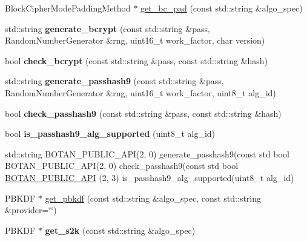 \begin{DoxyCompactItemize}
\item 
Block\+Cipher\+Mode\+Padding\+Method $\ast$ \mbox{\hyperlink{namespace_botan_ac22e1d5609dbde74a5f45f729f4c4c6a}{get\+\_\+bc\+\_\+pad}} (const std\+::string \&algo\+\_\+spec)
\item 
\mbox{\label{namespace_botan_a49cb36777eb93bb3b2ee508a712cf116}} 
std\+::string {\bfseries generate\+\_\+bcrypt} (const std\+::string \&pass, Random\+Number\+Generator \&rng, uint16\+\_\+t work\+\_\+factor, char version)
\item 
\mbox{\label{namespace_botan_a970c31b2eaaeec4fb9262eeabf0e37a1}} 
bool {\bfseries check\+\_\+bcrypt} (const std\+::string \&pass, const std\+::string \&hash)
\item 
\mbox{\label{namespace_botan_ad3dbec5bc18c846714aac5fe71708388}} 
std\+::string {\bfseries generate\+\_\+passhash9} (const std\+::string \&pass, Random\+Number\+Generator \&rng, uint16\+\_\+t work\+\_\+factor, uint8\+\_\+t alg\+\_\+id)
\item 
\mbox{\label{namespace_botan_a9082402c1ec67dfa5dfcf73261814058}} 
bool {\bfseries check\+\_\+passhash9} (const std\+::string \&pass, const std\+::string \&hash)
\item 
\mbox{\label{namespace_botan_a9014e15d2214508d6508f31f4e697b78}} 
bool {\bfseries is\+\_\+passhash9\+\_\+alg\+\_\+supported} (uint8\+\_\+t alg\+\_\+id)
\item 
std\+::string B\+O\+T\+A\+N\+\_\+\+P\+U\+B\+L\+I\+C\+\_\+\+A\+PI(2, 0) generate\+\_\+passhash9(const std bool B\+O\+T\+A\+N\+\_\+\+P\+U\+B\+L\+I\+C\+\_\+\+A\+PI(2, 0) check\+\_\+passhash9(const std bool \mbox{\hyperlink{namespace_botan_a3ae2ea6a22f08742864267f1a2a7a91c}{B\+O\+T\+A\+N\+\_\+\+P\+U\+B\+L\+I\+C\+\_\+\+A\+PI}} (2, 3) is\+\_\+passhash9\+\_\+alg\+\_\+supported(uint8\+\_\+t alg\+\_\+id)
\item 
P\+B\+K\+DF $\ast$ \mbox{\hyperlink{namespace_botan_a053bdfc377dda32b5d3c116e19c9d394}{get\+\_\+pbkdf}} (const std\+::string \&algo\+\_\+spec, const std\+::string \&provider=\char`\"{}\char`\"{})
\item 
\mbox{\label{namespace_botan_a5612cc6316fbfb5d5a5b100c9cf7064e}} 
P\+B\+K\+DF $\ast$ {\bfseries get\+\_\+s2k} (const std\+::string \&algo\+\_\+spec)

\end{DoxyCompactItemize}
